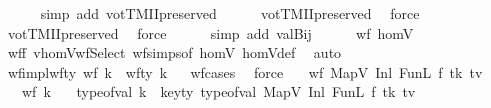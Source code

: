 \begin{isabellebody}
\ \ \ \ \isamarkupfalse%
\ {\isacharparenleft}{\kern0pt}simp\ add{\isacharcolon}{\kern0pt}\ votTMIIpreserved{\isacharparenright}{\kern0pt}\isanewline
\ \ \ \ \isamarkupfalse%
\ votTMIIpreserved\ \isamarkupfalse%
\ force\isanewline
\ \ \ \ \isamarkupfalse%
\ votTMIIpreserved\ \isamarkupfalse%
\ force\isanewline
\ \ \ \ \isamarkupfalse%
\ {\isacharparenleft}{\kern0pt}simp\ add{\isacharcolon}{\kern0pt}\ valBij{}{\isacharparenright}{\kern0pt}{\isacharplus}{\kern0pt}\isanewline
\ \ \ \ \isamarkupfalse%
\isanewline
{}\isamarkupfalse%
%
\endisatagproof
{\isafoldproof}%
%
\isadelimproof
\isanewline
%
\endisadelimproof
\isanewline
{}\isamarkupfalse%
\ {\isachardoublequoteopen}wf\ homV{\isachardoublequoteclose}%
\isadelimproof
\ %
\endisadelimproof
%
\isatagproof
{}\isamarkupfalse%
\ wff\ vhomVwfSelect\ wf{\isachardot}{\kern0pt}simps{\isacharbrackleft}{\kern0pt}of\ homV{\isacharbrackright}{\kern0pt}\ homVdef\ \isamarkupfalse%
\ auto%
\endisatagproof
{\isafoldproof}%
%
\isadelimproof
%
\endisadelimproof
\isanewline
\isanewline
{}\isamarkupfalse%
%
\isadelimdocument
%
\endisadelimdocument
%
\isatagdocument
%
\isamarkuptrue%
%
\endisatagdocument
{\isafolddocument}%
%
\isadelimdocument
%
\endisadelimdocument
{}\isamarkupfalse%
\ wf{\isacharunderscore}{\kern0pt}impl{\isacharunderscore}{\kern0pt}wf{\isacharunderscore}{\kern0pt}ty{\isacharcolon}{\kern0pt}\ {\isachardoublequoteopen}wf\ k\ {\isasymLongrightarrow}\ wf{\isacharunderscore}{\kern0pt}ty\ k{\isachardoublequoteclose}%
\isadelimproof
\ %
\endisadelimproof
%
\isatagproof
{}\isamarkupfalse%
\ wf{\isachardot}{\kern0pt}cases\ \isamarkupfalse%
\ force%
\endisatagproof
{\isafoldproof}%
%
\isadelimproof
%
\endisadelimproof
\isanewline
\isanewline
\isanewline
{}\isamarkupfalse%
\isanewline
\ \ \ {\isachardoublequoteopen}wf\ {\isacharparenleft}{\kern0pt}MapV\ {\isacharparenleft}{\kern0pt}Inl\ {\isacharparenleft}{\kern0pt}FunL\ f\ tk\ tv{\isacharparenright}{\kern0pt}{\isacharparenright}{\kern0pt}{\isacharparenright}{\kern0pt}{\isachardoublequoteclose}\isanewline
\ \ \ {\isachardoublequoteopen}wf\ k{\isachardoublequoteclose}\isanewline
\ \ \ {\isachardoublequoteopen}type{\isacharunderscore}{\kern0pt}of{\isacharunderscore}{\kern0pt}val\ k\ {\isacharequal}{\kern0pt}\ key{\isacharunderscore}{\kern0pt}ty\ {\isacharparenleft}{\kern0pt}type{\isacharunderscore}{\kern0pt}of{\isacharunderscore}{\kern0pt}val\ {\isacharparenleft}{\kern0pt}MapV\ {\isacharparenleft}{\kern0pt}Inl\ {\isacharparenleft}{\kern0pt}FunL\ f\ tk\ tv{\isacharparenright}{\kern0pt}{\isacharparenright}{\kern0pt}{\isacharparenright}{\kern0pt}{\isacharparenright}{\kern0pt}{\isachardoublequoteclose}\isanewline

\end{isabellebody}
